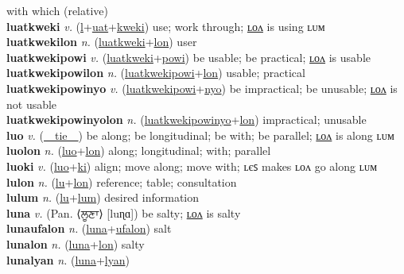 with which (relative) \label{luat} \\
\textbf{luatkweki} \textit{v.} (\hyperref[l]{l}+\hyperref[uat]{uat}+\hyperref[kweki]{kweki})
use; work through; \hyperref[luatkwekilon]{ʟᴏᴧ} is using ʟᴜᴍ \label{luatkweki} \\
\textbf{luatkwekilon} \textit{n.} (\hyperref[luatkweki]{luatkweki}+\hyperref[lon]{lon})
user \label{luatkwekilon} \\
\textbf{luatkwekipowi} \textit{v.} (\hyperref[luatkweki]{luatkweki}+\hyperref[powi]{powi})
be usable; be practical; \hyperref[luatkwekipowilon]{ʟᴏᴧ} is usable \label{luatkwekipowi} \\
\textbf{luatkwekipowilon} \textit{n.} (\hyperref[luatkwekipowi]{luatkwekipowi}+\hyperref[lon]{lon})
usable; practical \label{luatkwekipowilon} \\
\textbf{luatkwekipowinyo} \textit{v.} (\hyperref[luatkwekipowi]{luatkwekipowi}+\hyperref[nyo]{nyo})
be impractical; be unusable; \hyperref[luatkwekipowinyolon]{ʟᴏᴧ} is not usable \label{luatkwekipowinyo} \\
\textbf{luatkwekipowinyolon} \textit{n.} (\hyperref[luatkwekipowinyo]{luatkwekipowinyo}+\hyperref[lon]{lon})
impractical; unusable \label{luatkwekipowinyolon} \\
\textbf{luo} \textit{v.} (\hyperref[tie]{~~tie~~})
be along; be longitudinal; be with; be parallel; \hyperref[luolon]{ʟᴏᴧ} is along ʟᴜᴍ \label{luo} \\
\textbf{luolon} \textit{n.} (\hyperref[luo]{luo}+\hyperref[lon]{lon})
along; longitudinal; with; parallel \label{luolon} \\
\textbf{luoki} \textit{v.} (\hyperref[luo]{luo}+\hyperref[ki]{ki})
align; move along; move with; ʟєꜱ makes ʟᴏᴧ go along ʟᴜᴍ \label{luoki} \\
\textbf{lulon} \textit{n.} (\hyperref[lu]{lu}+\hyperref[lon]{lon})
reference; table; consultation \label{lulon} \\
\textbf{lulum} \textit{n.} (\hyperref[lu]{lu}+\hyperref[lum]{lum})
desired information \label{lulum} \\
\textbf{luna} \textit{v.} (Pan. ⟨ਲੂਣਾ⟩ [luɳɑ])
be salty; \hyperref[lunalon]{ʟᴏᴧ} is salty \label{luna} \\
\textbf{lunaufalon} \textit{n.} (\hyperref[luna]{luna}+\hyperref[ufalon]{ufalon})
salt \label{lunaufalon} \\
\textbf{lunalon} \textit{n.} (\hyperref[luna]{luna}+\hyperref[lon]{lon})
salty \label{lunalon} \\
\textbf{lunalyan} \textit{n.} (\hyperref[luna]{luna}+\hyperref[lyan]{lyan})

